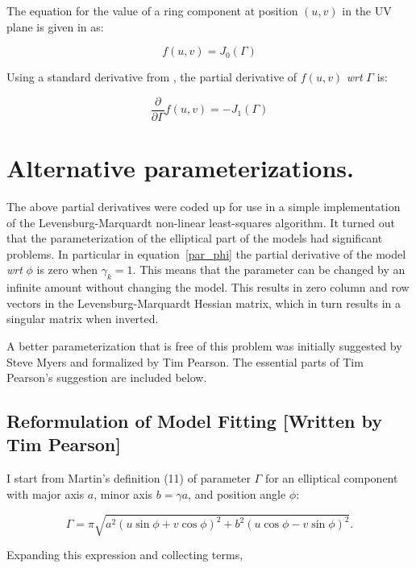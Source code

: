 \documentclass[11pt]{article}
\begin{document}
The equation for the value of a ring component at position $(u,v)$ in
the UV plane is given in \cite{tjp91} as:

\begin{equation}
f(u,v) = J_{0}(\Gamma)
\end{equation}

Using a standard derivative from \cite{handbook}, the partial
derivative of $f(u,v)$ {\em wrt} $\Gamma$ is:

\begin{equation}
\frac{\partial}{\partial\Gamma} f(u,v) = -J_{1}(\Gamma)
\end{equation}

\section{Alternative parameterizations.}

The above partial derivatives were coded up for use in a simple
implementation of the Levensburg-Marquardt non-linear least-squares
algorithm. It turned out that the parameterization of the elliptical
part of the models had significant problems. In particular in
equation~\ref{par_phi} the partial derivative of the model {\em wrt}
$\phi$ is zero when $\gamma_{k}=1$. This means that the parameter can
be changed by an infinite amount without changing the model. This
results in zero column and row vectors in the Levensburg-Marquardt
Hessian matrix, which in turn results in a singular matrix when
inverted.

A better parameterization that is free of this problem was initially
suggested by Steve Myers and formalized by Tim Pearson. The essential
parts of Tim Pearson's suggestion are included below.

\subsection{Reformulation of Model Fitting [Written by Tim Pearson]}

I start from Martin's definition (11) of parameter $\Gamma$ for an
elliptical component with major axis $a$, minor axis $b= \gamma a$,
and position angle $\phi$: 

\begin{equation}
\Gamma = \pi \sqrt{a^2(u \sin\phi + v\cos\phi)^2 + b^2(u\cos\phi -
v\sin\phi)^2}.
\end{equation}

Expanding this expression and collecting terms,
\end{document}
